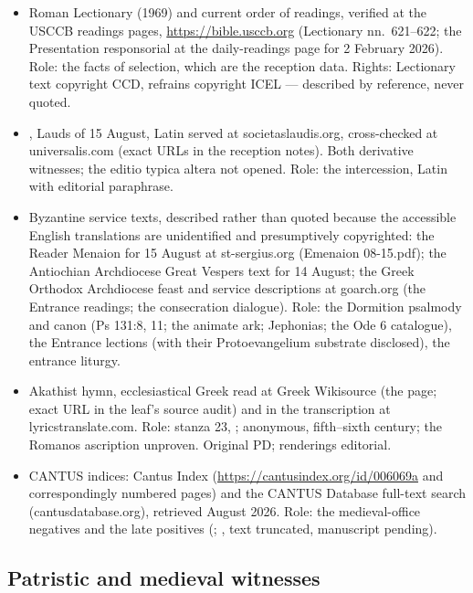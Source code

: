 \begin{itemize}
\ldots, quoted as printed; the
Fortunatus hymn  in the Urban VIII
revision) and the bound-in 1950 supplement (). Latin quoted with labeled editorial paraphrases.
\item Roman Lectionary (1969) and current order of readings, verified at
the USCCB readings pages, \url{https://bible.usccb.org} (Lectionary
nn.~621--622; the Presentation responsorial at the daily-readings page
for 2 February 2026). Role: the facts of selection, which are the
reception data. Rights: Lectionary text copyright CCD, refrains
copyright ICEL --- described by reference, never quoted.
\item {}, Lauds of 15 August, Latin served at
societaslaudis.org, cross-checked at universalis.com (exact URLs in the
reception notes). Both derivative witnesses; the editio typica altera
not opened. Role: the  intercession, Latin
with editorial paraphrase.
\item Byzantine service texts, described rather than quoted because the
accessible English translations are unidentified and presumptively
copyrighted: the Reader Menaion for 15 August at st-sergius.org
(Emenaion 08-15.pdf); the Antiochian Archdiocese Great Vespers text for
14 August; the Greek Orthodox Archdiocese feast and service
descriptions at goarch.org (the Entrance readings; the consecration
dialogue). Role: the Dormition psalmody and canon (Ps 131:8, 11; the
animate ark; Jephonias; the Ode 6 catalogue), the Entrance lections
(with their Protoevangelium substrate disclosed), the entrance liturgy.
\item Akathist hymn, ecclesiastical Greek read at Greek
Wikisource (the  page; exact URL in the leaf's
source audit) and in the transcription at lyricstranslate.com. Role: stanza 23,
; anonymous, fifth--sixth
century; the Romanos ascription unproven. Original PD; renderings
editorial.
\item CANTUS indices: Cantus Index
(\url{https://cantusindex.org/id/006069a} and correspondingly numbered
pages) and the CANTUS Database full-text search (cantusdatabase.org),
retrieved August 2026. Role: the medieval-office negatives and the late
positives (; , text truncated, manuscript pending).
\end{itemize}

\subsection*{Patristic and medieval witnesses}

